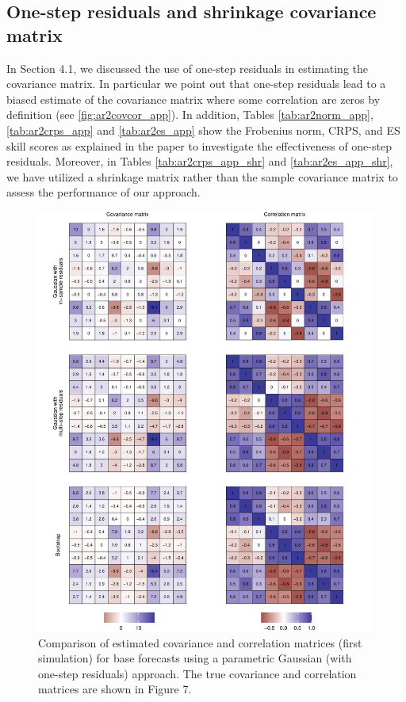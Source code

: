 \documentclass[a4paper,11pt]{article}
\theoremstyle{definition}
\begin{document}
\newpage
\subsection{One-step residuals and shrinkage covariance matrix}

In Section 4.1, we discussed the use of one-step residuals in estimating the covariance matrix. In particular we point out that one-step residuals lead to a biased estimate of the covariance matrix where some correlation are zeros by definition (see \autoref{fig:ar2covcor_app}). 
In addition, Tables \ref{tab:ar2norm_app}, \ref{tab:ar2crps_app} and \ref{tab:ar2es_app} show the Frobenius norm, CRPS, and ES skill scores as explained in the paper to investigate the effectiveness of one-step residuals. 
Moreover, in Tables \ref{tab:ar2crps_app_shr} and \ref{tab:ar2es_app_shr}, we have utilized a shrinkage matrix rather than the sample covariance matrix to assess the performance of our approach.

\begin{figure}[p]
	\centering
	\includegraphics[width = \linewidth]{fig/AR/base_cov_app.pdf}
	\caption{Comparison of estimated covariance and correlation matrices (first simulation) for base forecasts using a parametric Gaussian (with one-step residuals) approach. The true covariance and correlation matrices are shown in Figure 7.}
	\label{fig:ar2covcor_app}
\end{figure}
\end{document}
